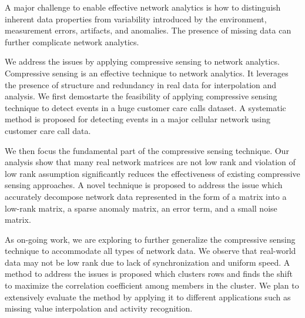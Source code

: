 \documentclass[12pt]{report}  %
\theoremstyle{plain} %
\theoremstyle{definition}
\theoremstyle{remark}
\numberwithin{equation}{section}
\begin{document}
A major challenge to enable effective network analytics is how to distinguish inherent data properties from variability introduced by the environment, measurement errors, artifacts, and anomalies. The presence of missing data can further complicate network analytics.

We address the issues by applying compressive sensing to network analytics. Compressive sensing is an effective technique to network analytics. It leverages the presence of structure and redundancy in real data for interpolation and analysis. We first demostarte the feasibility of applying compressive sensing technique to detect events in a huge customer care calls dataset. A systematic method is proposed for detecting events in a major cellular network using customer care call data. 

We then focus the fundamental part of the compressive sensing technique. Our analysis show that many real network matrices are not low rank and violation of low rank assumption significantly reduces the effectiveness of existing compressive sensing approaches. A novel technique is proposed to address the issue which accurately decompose network data represented in the form of a matrix into a low-rank matrix, a sparse anomaly matrix, an error term, and a small noise matrix.

As on-going work, we are exploring to further generalize the compressive sensing technique to accommodate all types of network data. We observe that real-world data may not be low rank due to lack of synchronization and uniform speed. A method to address the issues is proposed which clusters rows and finds the shift to maximize the correlation coefficient among members in the cluster. We plan to extensively evaluate the method by applying it to different applications such as missing value interpolation and activity recognition.






\tableofcontents   %
\end{document}
